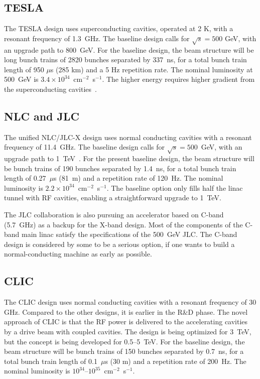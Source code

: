 \subsection{TESLA}

The TESLA design uses superconducting cavities, operated at 2 K,
with a resonant frequency of 1.3~GHz.  The baseline design calls for
$\sqrt{s}=500$ GeV, with an upgrade path to 800~GeV.  For the baseline
design, the beam structure will be long bunch trains of 2820 bunches
separated by 337~ns, for a total bunch train length of 950 $\mu$s
(285 km) and a 5 Hz repetition rate.  The nominal luminosity at 500~GeV
is $3.4\times 10^{34}$~cm$^{-2}$~s$^{-1}$. The higher energy
requires higher gradient from the superconducting cavities~\cite{Tesla:II}.

\subsection{NLC and JLC}

The unified NLC/JLC-X design uses normal conducting cavities with
a resonant frequency of 11.4~GHz.
The baseline design calls for $\sqrt{s}=500$~GeV,
with an upgrade path to 1~TeV~\cite{NLC:Snowmass}.
For the present baseline design, the beam
structure will be bunch trains of 190 bunches separated by 1.4~ns,
for a total bunch train length of
0.27~$\mu$s (81~m) and a repetition rate of 120~Hz.  The nominal
luminosity is $2.2\times 10^{34}$~cm$^{-2}$~s$^{-1}$.  The baseline
option only fills half the linac tunnel with RF cavities, enabling
a straightforward upgrade to 1~TeV.

The JLC collaboration is also pursuing an accelerator based on C-band 
(5.7~GHz) as a backup for the X-band design.
Most of the components of the C-band main linac satisfy the
specifications of the 500~GeV JLC.
The C-band design is considered by some to be a serious option, if one
wants to build a normal-conducting machine as early as possible.

\subsection{CLIC}

The CLIC design uses normal conducting cavities with a resonant
frequency of 30 GHz.  Compared to the other designs, it is earlier
in the R\&D phase.  The novel approach of CLIC is that the
RF power is delivered to the accelerating cavities by a drive beam
with coupled cavities.  The design is being optimized for 3~TeV,
but the concept is being developed for 0.5--5~TeV.  For the baseline
design, the beam structure will be bunch trains of 150 bunches
separated by 0.7~ns, for a total bunch train length of 0.1~$\mu$s
(30 m) and a repetition rate of 200~Hz.  The nominal luminosity is
$10^{34}$--$10^{35}$~cm$^{-2}$~s$^{-1}$.


